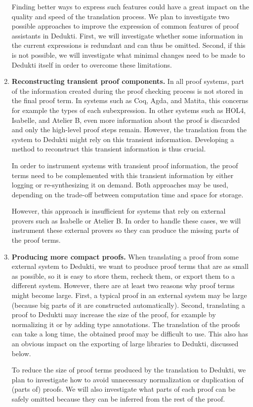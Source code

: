 \begin{enumerate}[\bf(a)]
Finding better ways to express such features could have a great impact
on the quality and speed of the translation process.  We plan to
investigate two possible approaches to improve the expression of
common features of proof assistants in Dedukti. First, we will
investigate whether some information in the current expressions is
redundant and can thus be omitted. Second, if this is not possible, we
will investigate what minimal changes need to be made to Dedukti
itself in order to overcome these limitations.

\item{\bf Reconstructing transient proof components.}
In all proof systems, part of the information created during
the proof checking process is not stored in the final proof
term. In systems such as Coq, Agda, and Matita, this concerns for
example the types of each subexpression. In other systems such as
HOL4, Isabelle, and Atelier B, even more information about the proof
is discarded and only the high-level proof steps remain.  However, the
translation from the system to Dedukti might rely on this transient
information. Developing a method to reconstruct this transient
information is thus crucial.

In order to instrument systems with transient
proof information, the proof terms need to be complemented with this
transient information by either logging or re-synthesizing it on
demand. Both approaches may be used, depending on the trade-off
between computation time and space for storage.

However, this approach is insufficient for systems that rely on
external provers such as Isabelle or Atelier B. In order to handle
these cases, we will instrument these external
provers so they can produce the missing parts of the proof terms.

\item{\bf Producing more compact proofs.}  When translating a proof
  from some external system to Dedukti, we want to produce proof terms
  that are as small as possible, so it is easy to store them, recheck
  them, or export them to a different system. However, there are at
  least two reasons why proof terms might become large. First, a
  typical proof in an external system may be large (because big parts
  of it are constructed automatically). Second, translating a proof to
  Dedukti may increase the size of the proof, for example by
  normalizing it or by adding type annotations.  The translation of
  the proofs can take a long time, the obtained proof may be difficult
  to use. This also has an obvious impact on the exporting of large
  libraries to Dedukti, discussed below.

To reduce the size of proof terms produced by the translation to
Dedukti, we plan to investigate how to avoid unnecessary
normalization or duplication of (parts of) proofs. We will also
investigate what parts of each proof can be safely omitted because
they can be inferred from the rest of the proof.
\end{enumerate}

